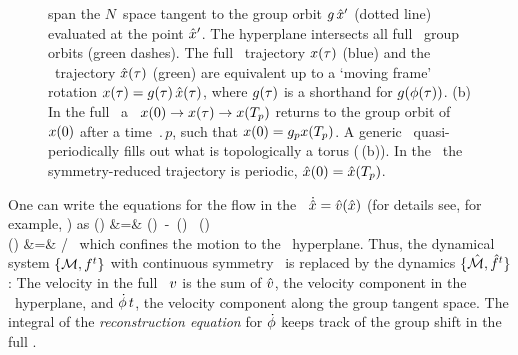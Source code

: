 \documentclass[aip,cha,reprint,
secnumarabic,
nofootinbib, tightenlines,
nobibnotes, showkeys, showpacs,
groupedaddress
]{revtex4-1}
\begin{document}
\begin{figure}
{span the $N$\dmn\ space tangent to the group orbit $g\,{\hat{x}'}$
(dotted line) evaluated at the {\template} point ${\hat{x}'}$. The
hyperplane intersects {all} full \statesp\ group orbits (green
dashes).  The full \statesp\
trajectory $x(\tau)$ (blue) and the \reducedsp\ trajectory
$\hat{x}(\tau)$ (green) are equivalent up to a `moving frame' rotation
$x(\tau)=g(\tau)\,\hat{x}(\tau)$, where $g(\tau)$ is a
shorthand for $g({\bf \phi}(\tau))$.
(b)
In the full \statesp\ a \rpo\ $x(0) \to x(\tau) \to
x({T_{p}})$ returns to the group orbit of $x(0)$ after a time
$\period{p}$,  such that $x(0)=g _p  x
({T_{p}})$. A generic \rpo\ quasi-\-periodically fills out what is
topologically a torus (\reffig{fig:CLf01group}\,(b)). In the \slice\
the symmetry-reduced trajectory is periodic, $\hat{x}(0) =
\hat{x}({T_{p}})$.
 }\label{fig:slice}
 \end{figure}

One can write the equations for the flow in the \reducedsp\
$\dot{\hat{x}} = \hat{v}(\hat{x})$ (for details see, for example,
) as
\bea
\velRed(\sspRed) &=& \vel(\sspRed)
     \,-\, \dot{\gSpace}(\sspRed) \, \groupTan(\sspRed)
\label{EqMotMFrame}\\
\dot{\gSpace}(\sspRed) &=& \braket{\vel(\sspRed)}{\sliceTan{}}
                       /\braket{\groupTan(\sspRed)}{\sliceTan{}}
\,
\label{reconstrEq}
\eea
which confines the motion to the \slice\ hyperplane. Thus, the dynamical
system $\{{\cal M},f^t\}$ with continuous symmetry \Group\ is replaced by
the {\reducedsp} dynamics $\{\hat{\cal M},\hat{f}^t\}$: The velocity in the
full \statesp\ $v$ is the sum of $\hat{v}$, the velocity component in
the \slice\ hyperplane, and $\dot{{\bf \phi}}\,t$, the velocity
component along the group tangent space. The integral of the {\em
reconstruction equation} for $\dot{{\bf \phi}}$ keeps track of the group
shift in the full \statesp.
\end{document}
